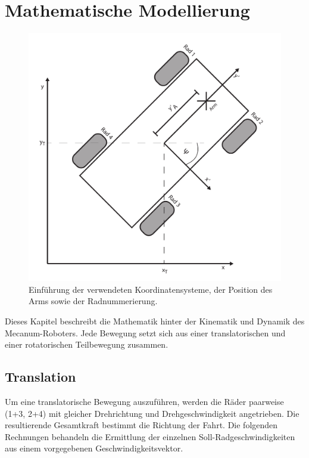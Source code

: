 

\section{Mathematische Modellierung}
\label{sec:Mathematische Modellierung}
\begin{figure}
    \centering
    \includegraphics[width=.8\textwidth]{Abbildungen/Koordinaten}
    \caption{Einführung der verwendeten Koordinatensysteme, der Position des Arms sowie der Radnummerierung.}
\end{figure}
Dieses Kapitel beschreibt die Mathematik hinter der Kinematik und Dynamik des Mecanum-Roboters.
Jede Bewegung setzt sich aus einer translatorischen und einer rotatorischen Teilbewegung zusammen.

\subsection{Translation}
\label{sec:Translation}
Um eine translatorische Bewegung auszuführen, werden die Räder paarweise (1+3, 2+4) mit gleicher Drehrichtung und Drehgeschwindigkeit angetrieben.
Die resultierende Gesamtkraft bestimmt die Richtung der Fahrt.
Die folgenden Rechnungen behandeln die Ermittlung der einzelnen Soll-Radgeschwindigkeiten aus einem vorgegebenen Geschwindigkeitsvektor.

